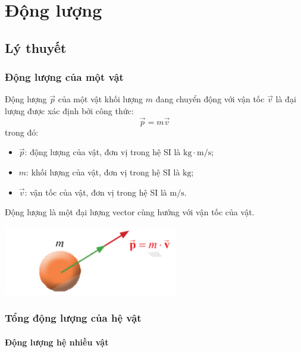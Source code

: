\let\lesson\undefined
\newcommand{\lesson}{\phantomlesson{Bài 18: Động lượng.}}
\chapter[Động lượng]{Động lượng}
\setcounter{section}{0}
\section{Lý thuyết}
\subsection{Động lượng của một vật}
\begin{minipage}{0.6\textwidth}
	Động lượng $\vec{p}$ của một vật khối lượng $m$ đang chuyển động với vận tốc $\vec{v}$ là đại lượng được xác định bởi công thức:
	\begin{equation*}
		\vec{p}=m\vec{v}
	\end{equation*}
	trong đó:
	\begin{itemize}
		\item $\vec{p}$: động lượng của vật, đơn vị trong hệ SI là $\si{\kilogram\cdot\meter/\second}$;
		\item $m$: khối lượng của vật, đơn vị trong hệ SI là $\si{\kilogram}$;
		\item $\vec{v}$: vận tốc của vật, đơn vị trong hệ SI là $\si{\meter/\second}$.
	\end{itemize}
	Động lượng là một đại lượng vector cùng hướng với vận tốc của vật.
\end{minipage}
\begin{minipage}{0.4\textwidth}
	\begin{center}
		\includegraphics[scale=0.7]{../figs/G10-023-1}
	\end{center}
\end{minipage}
\subsection{Tổng động lượng của hệ vật}
\subsubsection{Động lượng hệ nhiều vật}

